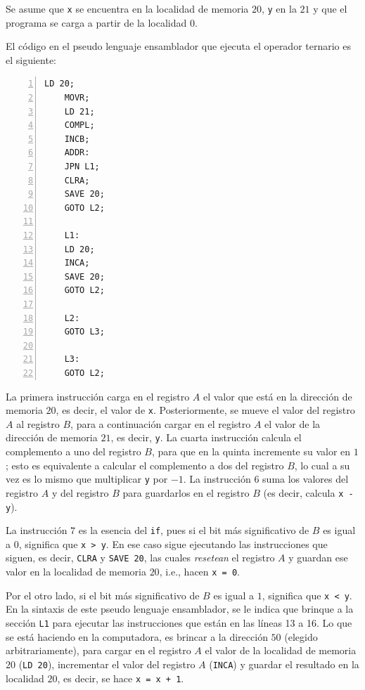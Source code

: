 \documentclass{article}
\begin{document}
Se asume que \texttt{x} se encuentra en la localidad de memoria $20$, \texttt{y} en la $21$ y que el programa se carga a partir de la localidad $0$.

El código en el pseudo lenguaje ensamblador que ejecuta el operador ternario es el siguiente:

\begin{Verbatim}[numbers=left,xleftmargin=5mm]
    LD 20;
    MOVR;
    LD 21;
    COMPL;
    INCB;
    ADDR:
    JPN L1; 
    CLRA;
    SAVE 20;
    GOTO L2;
    
    L1:
    LD 20;
    INCA;
    SAVE 20;
    GOTO L2;
    
    L2:
    GOTO L3;
    
    L3:
    GOTO L2;
\end{Verbatim}

La primera instrucción carga en el registro $A$ el valor que está en la dirección de memoria $20$, es decir, el valor de \texttt{x}. Posteriormente, se mueve el valor del registro $A$ al registro $B$, para a continuación cargar en el registro $A$ el valor de la dirección de memoria $21$, es decir, \texttt{y}. La cuarta instrucción calcula el complemento a uno del registro $B$, para que en la quinta incremente su valor en $1$; esto es equivalente a calcular el complemento a dos del registro $B$, lo cual a su vez es lo mismo que multiplicar \texttt{y} por $-1$. La instrucción 6 suma los valores del registro $A$ y del registro $B$ para guardarlos en el registro $B$ (es decir, calcula \texttt{x - y}).

La instrucción $7$ es la esencia del \texttt{if}, pues si el bit más significativo de $B$ es igual a $0$, significa que \texttt{x > y}. En ese caso sigue ejecutando las instrucciones que siguen, es decir, \texttt{CLRA} y \texttt{SAVE 20}, las cuales \emph{resetean} el registro $A$ y guardan ese valor en la localidad de memoria $20$, i.e., hacen \texttt{x = 0}.

Por el otro lado, si el bit más significativo de $B$ es igual a $1$, significa que \texttt{x < y}. En la sintaxis de este pseudo lenguaje ensamblador, se le indica que brinque a la sección \texttt{L1} para ejecutar las instrucciones que están en las líneas 13 a 16. Lo que se está haciendo en la computadora, es brincar a la dirección $50$ (elegido arbitrariamente), para cargar en el registro $A$ el valor de la localidad de memoria $20$ (\texttt{LD 20}), incrementar el valor del registro $A$ (\texttt{INCA}) y guardar el resultado en la localidad $20$, es decir, se hace \texttt{x = x + 1}.
\end{document}
